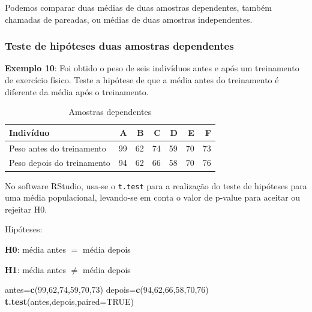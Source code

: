 \documentclass[12pt,brazil,oneside]{book}
\newenvironment{Shaded}{\begin{snugshade}}{\end{snugshade}}
\newcommand{\DataTypeTok}[1]{\textcolor[rgb]{0.13,0.29,0.53}{#1}}
\newcommand{\DecValTok}[1]{\textcolor[rgb]{0.00,0.00,0.81}{#1}}
\newcommand{\KeywordTok}[1]{\textcolor[rgb]{0.13,0.29,0.53}{\textbf{#1}}}
\newcommand{\NormalTok}[1]{#1}
\newcommand{\OtherTok}[1]{\textcolor[rgb]{0.56,0.35,0.01}{#1}}
\begin{document}
Podemos comparar duas médias de duas amostras dependentes, também
chamadas de pareadas, ou médias de duas amostras independentes.

\hypertarget{teste-de-hipoteses-duas-amostras-dependentes}{%
\subsubsection{Teste de hipóteses duas amostras
dependentes}\label{teste-de-hipoteses-duas-amostras-dependentes}}

\textbf{Exemplo 10}: Foi obtido o peso de seis indivíduos antes e após
um treinamento de exercício físico. Teste a hipótese de que a média
antes do treinamento é diferente da média após o treinamento.

\begin{table}

\caption{\label{tab:unnamed-chunk-108}Amostras dependentes}
\centering
\begin{tabular}[t]{l|r|r|r|r|r|r}
\hline
Indivíduo & A & B & C & D & E & F\\
\hline
Peso antes do treinamento & 99 & 62 & 74 & 59 & 70 & 73\\
\hline
Peso depois do treinamento & 94 & 62 & 66 & 58 & 70 & 76\\
\hline
\end{tabular}
\end{table}

No software RStudio, usa-se o \texttt{t.test} para a realização do teste
de hipóteses para uma média populacional, levando-se em conta o valor de
p-value para aceitar ou rejeitar H0.

Hipóteses:

\textbf{H0}: média antes \(=\) média depois

\textbf{H1}: média antes \(\neq\) média depois

\begin{Shaded}
\begin{Highlighting}[]
\NormalTok{antes=}\KeywordTok{c}\NormalTok{(}\DecValTok{99}\NormalTok{,}\DecValTok{62}\NormalTok{,}\DecValTok{74}\NormalTok{,}\DecValTok{59}\NormalTok{,}\DecValTok{70}\NormalTok{,}\DecValTok{73}\NormalTok{)}
\NormalTok{depois=}\KeywordTok{c}\NormalTok{(}\DecValTok{94}\NormalTok{,}\DecValTok{62}\NormalTok{,}\DecValTok{66}\NormalTok{,}\DecValTok{58}\NormalTok{,}\DecValTok{70}\NormalTok{,}\DecValTok{76}\NormalTok{)}
\KeywordTok{t.test}\NormalTok{(antes,depois,}\DataTypeTok{paired=}\OtherTok{TRUE}\NormalTok{)}
\end{Highlighting}
\end{Shaded}
\end{document}
